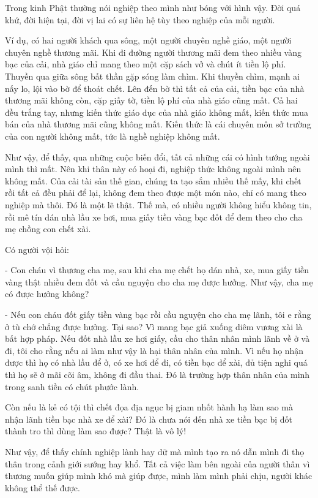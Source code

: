 \documentclass[
  12pt,
  oneside]{book}
\begin{document}
Trong kinh Phật thường nói nghiệp theo mình như bóng với hình vậy. Đời quá khứ, đời hiện tại, đời vị lai có sự liên hệ tùy theo nghiệp của mỗi người.

Ví dụ, có hai người khách qua sông, một người chuyên nghề giáo, một người chuyên nghề thương mãi. Khi đi đường người thương mãi đem theo nhiều vàng bạc của cải, nhà giáo chỉ mang theo một cặp sách vở và chút ít tiền lộ phí. Thuyền qua giữa sông bất thần gặp sóng làm chìm. Khi thuyền chìm, mạnh ai nấy lo, lội vào bờ để thoát chết. Lên đến bờ thì tất cả của cải, tiền bạc của nhà thương mãi không còn, cặp giấy tờ, tiền lộ phí của nhà giáo cũng mất. Cả hai đều trắng tay, nhưng kiến thức giáo dục của nhà giáo không mất, kiến thức mua bán của nhà thương mãi cũng không mất. Kiến thức là cái chuyên môn sở trường của con người không mất, tức là nghề nghiệp không mất.

Như vậy, để thấy, qua những cuộc biến đổi, tất cả những cái có hình tướng ngoài mình thì mất. Nên khi thân này có hoại đi, nghiệp thức không ngoài mình nên không mất. Của cải tài sản thế gian, chúng ta tạo sắm nhiều thế mấy, khi chết rồi tất cả đều phải để lại, không đem theo được một món nào, chỉ có mang theo nghiệp mà thôi. Đó là một lẽ thật. Thế mà, có nhiều người không hiểu không tin, rồi mê tín dán nhà lầu xe hơi, mua giấy tiền vàng bạc đốt để đem theo cho cha mẹ chồng con chết xài.

Có người vội hỏi:

- Con cháu vì thương cha mẹ, sau khi cha mẹ chết họ dán nhà, xe, mua giấy tiền vàng thật nhiều đem đốt và cầu nguyện cho cha mẹ được hưởng. Như vậy, cha mẹ có được hưởng không?

- Nếu con cháu đốt giấy tiền vàng bạc rồi cầu nguyện cho cha mẹ lãnh, tôi e rằng ở tù chớ chẳng được hưởng. Tại sao? Vì mang bạc giả xuống diêm vương xài là bất hợp pháp. Nếu đốt nhà lầu xe hơi giấy, cầu cho thân nhân mình lãnh về ở và đi, tôi cho rằng nếu ai làm như vậy là hại thân nhân của mình. Vì nếu họ nhận được thì họ có nhà lầu để ở, có xe hơi để đi, có tiền bạc để xài, đủ tiện nghi quá thì họ sẽ ở mãi cõi âm, không đi đầu thai. Đó là trường hợp thân nhân của mình trong sanh tiền có chút phước lành.

Còn nếu là kẻ có tội thì chết đọa địa ngục bị giam nhốt hành hạ làm sao mà nhận lãnh tiền bạc nhà xe để xài? Đó là chưa nói đến nhà xe tiền bạc bị đốt thành tro thì dùng làm sao được? Thật là vô lý!

Như vậy, để thấy chính nghiệp lành hay dữ mà mình tạo ra nó dẫn mình đi thọ thân trong cảnh giới sướng hay khổ. Tất cả việc làm bên ngoài của người thân vì thương muốn giúp mình khó mà giúp được, mình làm mình phải chịu, người khác không thể thế được.
\end{document}
